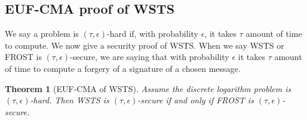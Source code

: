\documentclass{article}
\newtheorem{thm}{Theorem}[section]
\theoremstyle{definition}
\theoremstyle{remark}
\begin{document}
\subsection{EUF-CMA proof of WSTS}

We say a problem is $(\tau, \epsilon)$-hard if, with probability $\epsilon$, it takes $\tau$ amount of time to compute. We now give a security proof of WSTS. When we say WSTS or FROST is $(\tau, \epsilon)$-secure, we are saying that with probability $\epsilon$ it takes $\tau$ amount of time to compute a forgery of a signature of a chosen message.

\begin{thm}[EUF-CMA of WSTS]
    Assume the discrete logarithm problem is $(\tau, \epsilon)$-hard. Then WSTS is $(\tau, \epsilon)$-secure if and only if FROST is $(\tau, \epsilon)$-secure.
\end{thm}
\end{document}
